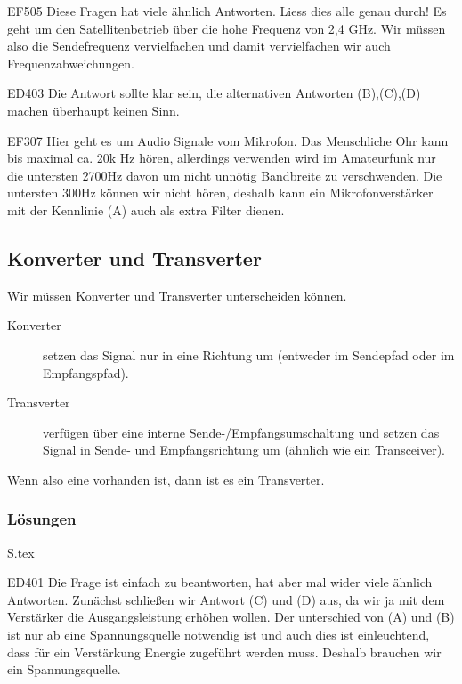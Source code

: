 \documentclass[10pt,a4paper,ngerman]{article}
\theoremstyle{definition}
\theoremstyle{plain}
\theoremstyle{mytheorem}
\theoremstyle{definition}
\newenvironment{ohmchapter}{}
{
  \subsubsection*{Lösungen}
  S\arabic{subsection}.tex}
}
\begin{document}
\begin{sol}{EF505}
    Diese Fragen hat viele ähnlich Antworten. Liess dies alle genau durch!
    Es geht um den Satellitenbetrieb über die hohe Frequenz von 2,4 GHz. Wir müssen also die Sendefrequenz vervielfachen und damit vervielfachen wir auch Frequenzabweichungen.
\end{sol}

\begin{sol}{ED403}
    Die Antwort sollte klar sein, die alternativen Antworten (B),(C),(D) machen überhaupt keinen Sinn.
\end{sol}

\begin{sol}{EF307}
    Hier geht es um Audio Signale vom Mikrofon. Das Menschliche Ohr kann bis maximal ca. 20k Hz hören, allerdings verwenden wird im Amateurfunk nur die untersten 2700Hz davon um nicht unnötig Bandbreite zu verschwenden. Die untersten 300Hz können wir nicht hören, deshalb kann ein Mikrofonverstärker mit der Kennlinie (A) auch als extra Filter dienen. 
\end{sol}

\subsection{Konverter und Transverter}
\begin{ohmchapter}
  Wir müssen Konverter und Transverter unterscheiden können.
  \begin{description}
  \item[Konverter] setzen das Signal nur in eine Richtung um (entweder im Sendepfad oder im Empfangspfad).
  \item[Transverter] verfügen über eine interne Sende-/Empfangsumschaltung und setzen das Signal in Sende- und Empfangsrichtung um (ähnlich wie ein Transceiver).
  \end{description} 
  Wenn also eine  vorhanden ist, dann ist es ein Transverter.
\end{ohmchapter}

\begin{sol}{ED401}
 Die Frage ist einfach zu beantworten, hat aber mal wider viele ähnlich Antworten.
 Zunächst schließen wir Antwort (C) und (D) aus, da wir ja mit dem Verstärker die Ausgangsleistung erhöhen wollen. Der unterschied von (A) und (B) ist nur ab eine Spannungsquelle notwendig ist und auch dies ist einleuchtend, dass für ein Verstärkung Energie zugeführt werden muss. Deshalb brauchen wir ein Spannungsquelle.  
\end{sol}
\end{document}
